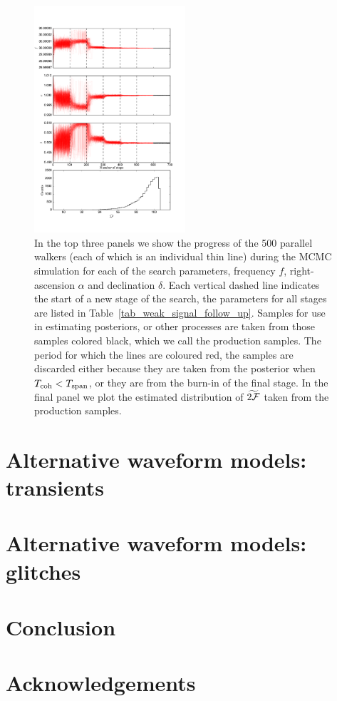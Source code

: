 \documentclass[aps, prd, twocolumn, superscriptaddress, floatfix, showpacs, nofootinbib, longbibliography]{revtex4-1}
\begin{document}
\begin{figure}[htb]
\centering
\includegraphics[width=0.5\textwidth]{weak_signal_follow_up_walkers}

\caption{In the top three panels we show the progress of the 500 parallel
walkers (each of which is an individual thin line) during the MCMC simulation
for each of the search parameters, frequency $f$, right-ascension $\alpha$ and
declination $\delta$. Each vertical dashed line indicates the start of a new
stage of the search, the parameters for all stages are listed in
Table~\ref{tab_weak_signal_follow_up}. Samples for use in estimating
posteriors, or other processes are taken from those samples colored black,
which we call the production samples.  The period for which the lines are
coloured red, the samples are discarded either because they are taken from the
posterior when $T_{\rm coh} < T_{\rm span}$, or they are from the burn-in of the final
stage. In the final panel we plot the estimated distribution of
$\widetilde{2{\mathcal{F}}}$ taken from the production samples.}

\label{fig_follow_up}
\end{figure}

\section{Alternative waveform models: transients}
\label{sec_transients}

\section{Alternative waveform models: glitches}
\label{sec_glitches}

\section{Conclusion}
\label{sec_conclusion}



\section{Acknowledgements}


\end{document}
